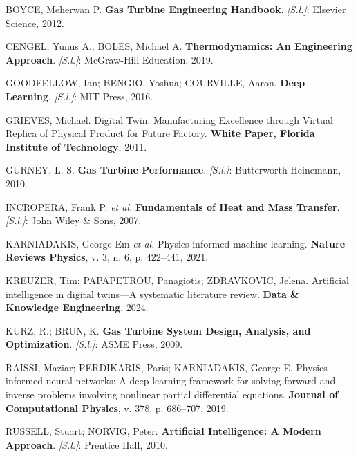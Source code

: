 \documentclass[
  12pt,
  oneside,
  a4paper,
  english,
  brazil]{abntex2}
\newlength{\cslhangindent}
\newenvironment{CSLReferences}[2] %
 {\begin{list}{}{%
  \setlength{\itemindent}{0pt}
  \setlength{\leftmargin}{0pt}
  \setlength{\parsep}{0pt}
  \ifodd #1
   \setlength{\leftmargin}{\cslhangindent}
   \setlength{\itemindent}{-1\cslhangindent}
  \fi
  \setlength{\itemsep}{#2\baselineskip}}}
 {\end{list}}
\begin{document}
\label{refs}
\begin{CSLReferences}{0}{1}
BOYCE, Meherwan P. \textbf{Gas Turbine Engineering Handbook}.
\emph{{[}S.l.{]}}: Elsevier Science, 2012.

CENGEL, Yunus A.; BOLES, Michael A. \textbf{Thermodynamics: An
Engineering Approach}. \emph{{[}S.l.{]}}: McGraw-Hill Education, 2019.

GOODFELLOW, Ian; BENGIO, Yoshua; COURVILLE, Aaron. \textbf{Deep
Learning}. \emph{{[}S.l.{]}}: MIT Press, 2016.

GRIEVES, Michael. Digital Twin: Manufacturing Excellence through Virtual
Replica of Physical Product for Future Factory. \textbf{White Paper,
Florida Institute of Technology}, 2011.

GURNEY, L. S. \textbf{Gas Turbine Performance}. \emph{{[}S.l.{]}}:
Butterworth-Heinemann, 2010.

INCROPERA, Frank P. \emph{et al.} \textbf{Fundamentals of Heat and Mass
Transfer}. \emph{{[}S.l.{]}}: John Wiley \& Sons, 2007.

KARNIADAKIS, George Em \emph{et al.} Physics-informed machine learning.
\textbf{Nature Reviews Physics}, v. 3, n. 6, p. 422--441, 2021.

KREUZER, Tim; PAPAPETROU, Panagiotis; ZDRAVKOVIC, Jelena. Artificial
intelligence in digital twins---A systematic literature review.
\textbf{Data \& Knowledge Engineering}, 2024.

KURZ, R.; BRUN, K. \textbf{Gas Turbine System Design, Analysis, and
Optimization}. \emph{{[}S.l.{]}}: ASME Press, 2009.

RAISSI, Maziar; PERDIKARIS, Paris; KARNIADAKIS, George E.
Physics-informed neural networks: A deep learning framework for solving
forward and inverse problems involving nonlinear partial differential
equations. \textbf{Journal of Computational Physics}, v. 378, p.
686--707, 2019.

RUSSELL, Stuart; NORVIG, Peter. \textbf{Artificial Intelligence: A
Modern Approach}. \emph{{[}S.l.{]}}: Prentice Hall, 2010.


\end{CSLReferences}
\end{document}
